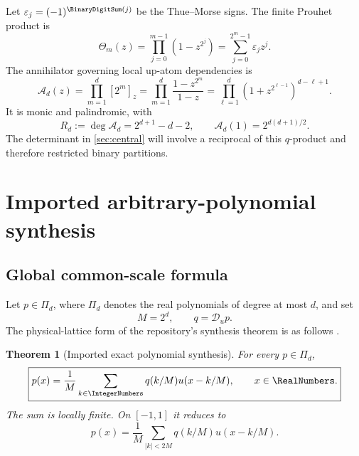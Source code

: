 \documentclass[11pt,oneside]{article}
\numberwithin{equation}{section}
\newtheorem{theorem}{Theorem}[section]
\theoremstyle{definition}
\theoremstyle{remark}
\newcommand{\Dscr}{\mathscr D_u}
\begin{document}
Let $\varepsilon_j=(-1)^{\BinaryDigitSum(j)}$ be the Thue--Morse signs.  The finite Prouhet
product is
\begin{equation}
 \Theta_m(z)=\prod_{j=0}^{m-1}(1-z^{2^j})
 =\sum_{j=0}^{2^m-1}\varepsilon_jz^j.
 \label{eq:thue-morse-product}
\end{equation}
The annihilator governing local up-atom dependencies is
\begin{equation}
 \mathcal A_d(z)=\prod_{m=1}^{d}[2^m]_z
 =\prod_{m=1}^{d}\frac{1-z^{2^m}}{1-z}
 =\prod_{\ell=1}^{d}(1+z^{2^{\ell-1}})^{d-\ell+1}.
 \label{eq:annihilator}
\end{equation}
It is monic and palindromic, with
\begin{equation}
 R_d:=\deg\mathcal A_d=2^{d+1}-d-2,
 \qquad \mathcal A_d(1)=2^{d(d+1)/2}.
 \label{eq:annihilator-data}
\end{equation}
The determinant in \cref{sec:central} will involve a reciprocal of this
$q$-product and therefore restricted binary partitions.

\section{Imported arbitrary-polynomial synthesis}
\label{sec:poly-synthesis}

\subsection{Global common-scale formula}

Let $p\in\Pi_d$, where $\Pi_d$ denotes the real polynomials of degree at most
$d$, and set
\begin{equation}
 M=2^d,\qquad q=\Dscr p.
 \label{eq:physical-q}
\end{equation}
The physical-lattice form of the repository's synthesis theorem is as follows
\cite{ReshetnikovSynthesis}.

\begin{theorem}[Imported exact polynomial synthesis]
\label{thm:physical-synthesis}
For every $p\in\Pi_d$,
\begin{equation}
 \boxed{
 p(x)=\frac1M\sum_{k\in\IntegerNumbers}q(k/M)u(x-k/M),\qquad x\in\RealNumbers.}
 \label{eq:physical-synthesis}
\end{equation}
The sum is locally finite.  On $[-1,1]$ it reduces to
\begin{equation}
 p(x)=\frac1M\sum_{|k|<2M}q(k/M)u(x-k/M).
 \label{eq:finite-physical}
\end{equation}
\end{theorem}
\end{document}
